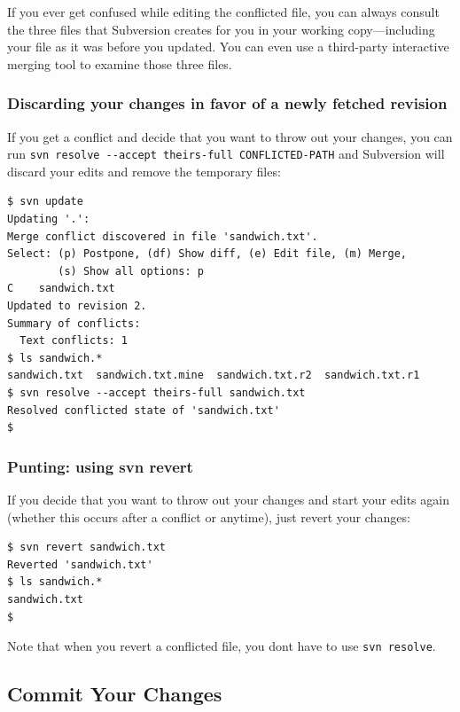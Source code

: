 If you ever get confused while editing the conflicted file, you can
always consult the three files that Subversion creates for you in your
working copy---including your file as it was before you updated. You can
even use a third-party interactive merging tool to examine those three
files.

\subsubsection{Discarding your changes in favor of a newly fetched
revision}\label{svn.tour.cycle.resolve.theirsfull}

If you get a conflict and decide that you want to throw out your
changes, you can run
\texttt{svn\ resolve\ -\/-accept\ theirs-full\ CONFLICTED-PATH} and
Subversion will discard your edits and remove the temporary files:

\begin{verbatim}
$ svn update
Updating '.':
Merge conflict discovered in file 'sandwich.txt'.
Select: (p) Postpone, (df) Show diff, (e) Edit file, (m) Merge,
        (s) Show all options: p
C    sandwich.txt
Updated to revision 2.
Summary of conflicts:
  Text conflicts: 1
$ ls sandwich.*
sandwich.txt  sandwich.txt.mine  sandwich.txt.r2  sandwich.txt.r1
$ svn resolve --accept theirs-full sandwich.txt
Resolved conflicted state of 'sandwich.txt'
$
\end{verbatim}

\subsubsection{Punting: using svn
revert}\label{svn.tour.cycle.resolve.revert}

If you decide that you want to throw out your changes and start your
edits again (whether this occurs after a conflict or anytime), just
revert your changes:

\begin{verbatim}
$ svn revert sandwich.txt
Reverted 'sandwich.txt'
$ ls sandwich.*
sandwich.txt
$
\end{verbatim}

Note that when you revert a conflicted file, you don\textquotesingle t
have to use \texttt{svn\ resolve}.

\subsection{Commit Your Changes}\label{svn.tour.cycle.commit}

